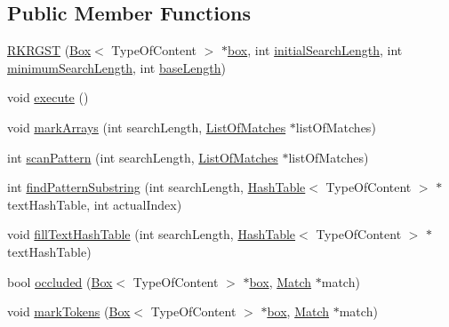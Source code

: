 \subsection*{Public Member Functions}
\begin{DoxyCompactItemize}
\item 
\hyperlink{classRKRGST_a66390e97e207872a55ea6ee0d3b2c0ee}{R\+K\+R\+G\+S\+T} (\hyperlink{classBox}{Box}$<$ Type\+Of\+Content $>$ $\ast$\hyperlink{classRKRGST_ae0737f82fb5c44b9edd663a9ed00a7fe}{box}, int \hyperlink{classRKRGST_ad4e450cff7656afab26be8eb27c4f87c}{initial\+Search\+Length}, int \hyperlink{classRKRGST_aaf28410e7b3c34bcfbffd17cd0d014b2}{minimum\+Search\+Length}, int \hyperlink{classRKRGST_a49054fd9d1f1fc34a5c2dedaba5e6f14}{base\+Length})
\item 
void \hyperlink{classRKRGST_aef01e8fd6c0e17482724c0f3fd7ad89f}{execute} ()
\item 
void \hyperlink{classRKRGST_a469647a68dc845b14b01d37505eee6d1}{mark\+Arrays} (int search\+Length, \hyperlink{classListOfMatches}{List\+Of\+Matches} $\ast$list\+Of\+Matches)
\item 
int \hyperlink{classRKRGST_a4ef9cf20505986d0f023a5384fdf844c}{scan\+Pattern} (int search\+Length, \hyperlink{classListOfMatches}{List\+Of\+Matches} $\ast$list\+Of\+Matches)
\item 
int \hyperlink{classRKRGST_a37cf8598f504f175035a83a69cfeaa08}{find\+Pattern\+Substring} (int search\+Length, \hyperlink{classHashTable}{Hash\+Table}$<$ Type\+Of\+Content $>$ $\ast$text\+Hash\+Table, int actual\+Index)
\item 
void \hyperlink{classRKRGST_a12e85e53ee2298818cead4ffe76eb8b3}{fill\+Text\+Hash\+Table} (int search\+Length, \hyperlink{classHashTable}{Hash\+Table}$<$ Type\+Of\+Content $>$ $\ast$text\+Hash\+Table)
\item 
bool \hyperlink{classRKRGST_aa2b3943e1897025c9f8293ee98edabca}{occluded} (\hyperlink{classBox}{Box}$<$ Type\+Of\+Content $>$ $\ast$\hyperlink{classRKRGST_ae0737f82fb5c44b9edd663a9ed00a7fe}{box}, \hyperlink{classMatch}{Match} $\ast$match)
\item 
void \hyperlink{classRKRGST_af44ddce704c698ee3cb38a7262a36874}{mark\+Tokens} (\hyperlink{classBox}{Box}$<$ Type\+Of\+Content $>$ $\ast$\hyperlink{classRKRGST_ae0737f82fb5c44b9edd663a9ed00a7fe}{box}, \hyperlink{classMatch}{Match} $\ast$match)
\end{DoxyCompactItemize}
